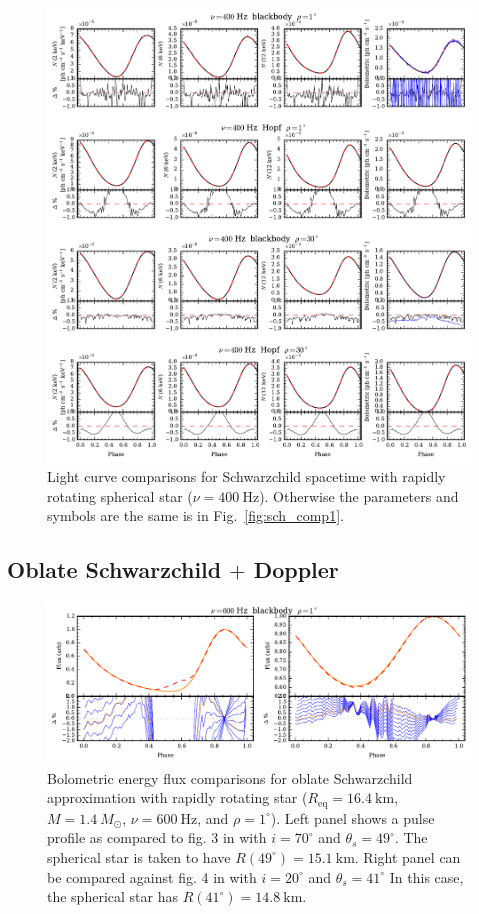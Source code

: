 \documentclass[iop, usenatbib]{emulateapj}
\newcommand{\Msun}{\ensuremath{M_{\odot}}}
\begin{document}
\begin{figure}
\centering
\includegraphics[width=18cm]{figs/fig2b.pdf}
\caption{\label{fig:sch_comp400}
  Light curve comparisons for Schwarzchild spacetime with rapidly rotating spherical star ($\nu = 400~\mathrm{Hz}$).
  Otherwise the parameters and symbols are the same is in Fig.~\ref{fig:sch_comp1}.
}
\end{figure}


\subsection{Oblate Schwarzchild $+$ Doppler}

\begin{figure}
\centering
\includegraphics[width=16cm]{figs/fig3.pdf}
\caption{\label{fig:sch_obl}
  Bolometric energy flux comparisons for oblate Schwarzchild approximation with rapidly rotating star ($R_{\mathrm{eq}} = 16.4~\mathrm{km}$, $M = 1.4~\Msun$, $\nu = 600~\mathrm{Hz}$, and $\rho = 1^{\circ}$).
  Left panel shows a pulse profile as compared to fig. 3 in \cite{MLCB07} with $i = 70^{\circ}$ and $\theta_s = 49^{\circ}$.
  The spherical star is taken to have $R(49^{\circ}) = 15.1~\mathrm{km}$.
  Right panel can be compared against fig. 4 in \cite{MLCB07} with $i = 20^{\circ}$ and $\theta_s = 41^{\circ}$
  In this case, the spherical star has $R(41^{\circ}) = 14.8~\mathrm{km}$.
}
\end{figure}
\end{document}
